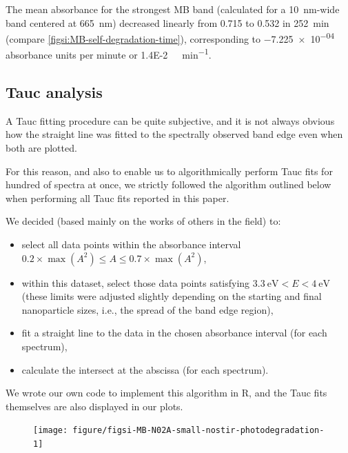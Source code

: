 \documentclass[9pt,twoside,twocolumn]{article}\usepackage{knitr}
\begin{document}
\begin{refsection}
The mean absorbance for the strongest MB band (calculated for a \qty{10}{\nm}-wide band centered at \qty{665}{\nm}) decreased linearly from \num{0.715} to \num{0.532} in \qty{252}{\minute} (compare \cref{figsi:MB-self-degradation-time}), corresponding to \num{-7.225e-04} absorbance units per minute or \qty{1.4E-2}{\micro\molar\per\minute}.





\subsection*{Tauc analysis}

A Tauc fitting procedure can be quite subjective, and it is not always obvious how the straight line was fitted to the spectrally observed band edge even when both are plotted.

For this reason, and also to enable us to algorithmically perform Tauc fits for hundred of spectra  at once, we strictly followed the algorithm outlined below when performing all Tauc fits reported in this paper.

We decided (based mainly on the works of others in the field) to:

\begin{itemize}[itemsep=0pt]
  \item select all data points within the absorbance interval $0.2\times\max(A^2)\leq A\leq 0.7\times\max(A^2)$,
  \item within this dataset, select those data points satisfying $\qty{3.3}{\eV}<E<\qty{4}{\eV}$ (these limits were adjusted slightly depending on the starting and final nanoparticle sizes, i.e., the spread of the band edge region), 
  \item fit a straight line to the data in the chosen absorbance interval (for each spectrum),
  \item calculate the intersect at the abscissa (for each spectrum).
\end{itemize}

We wrote our own code to implement this algorithm in R, and the Tauc fits themselves are also displayed in our plots.



\begin{figure}[tbp]
\centering
\begin{knitrout}\footnotesize
{}\color{fgcolor}

{\centering \texttt{[image: figure/figsi-MB-N02A-small-nostir-photodegradation-1]} 

}
\end{knitrout}
\end{figure}
\end{refsection}
\end{document}
